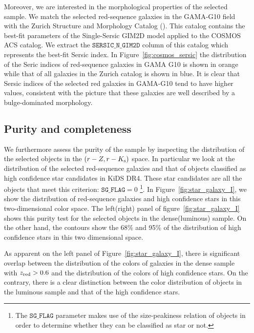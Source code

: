 \documentclass[fleqn,usenatbib,useAMS]{mnras}
\begin{document}
Moreover, we are interested in the morphological properties of the selected sample. We match the selected red-sequence galaxies in the GAMA-G10 field with the Zurich Structure and Morphology Catalog (\citealt{scarlata2007, sargent2007}). This catalog contains the best-fit parameters of the Single-Sersic GIM2D model applied to the COSMOS ACS catalog. We extract the $\mathtt{SERSIC\_N\_GIM2D}$ column of this catalog which represents the best-fit Sersic index. In Figure~\ref{fig:cosmos_sersic} the distribution of the Seric indices of red-sequence galaxies in GAMA G10 is shown in orange while that of all galaxies in the Zurich catalog is shown in blue. It is clear that Sersic indices of the selected red galaxies in GAMA-G10 tend to have higher values, consistent with the picture that these galaxies are well described by a bulge-dominated morphology.

\subsection{Purity and completeness}\label{sec:purity}

We furthermore assess the purity of the sample by inspecting the distribution of the selected objects in the $(r-Z, r-K_{\rm s})$ space. 
In particular we look at the distribution of the selected red-sequence galaxies and that of objects classified as high confidence star candidates in KiDS DR4. These star candidates are all the objects that meet this criterion: $\mathtt{SG\_FLAG}= 0$ \footnote{The $\mathtt{SG\_FLAG}$ parameter makes use of the size-peakiness relation of objects in order to determine whether they can be classified as star or not.}.
In Figure~\ref{fig:star_galaxy_I}, we show the distribution of red-sequence galaxies and high confidence stars in this two-dimensional color space. 
The left(right) panel of figure~\ref{fig:star_galaxy_I} shows this purity test for the selected objects in the dense(luminous) sample. On the other hand, the contours show the 68\% and 95\% of the distribution of high confidence stars in this two dimensional space. 

As apparent on the left panel of Figure~\ref{fig:star_galaxy_I}, there is significant overlap between the distribution of the colors of galaxies in the dense sample with $z_{\rm red}>0.6$ and the distribution of the colors of high confidence stars. On the contrary, there is a clear distinction between the color distribution of objects in the luminous sample and that of the high confidence stars. 
\end{document}
